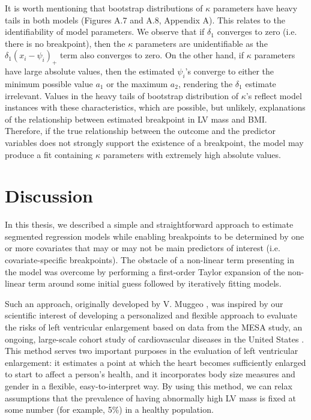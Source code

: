 \documentclass [12pt, proquest] {uwthesis}[2016/11/22]
\begin{document}
It is worth mentioning that bootstrap distributions of $\kappa$ parameters have heavy tails in both models (Figures A.7 and A.8, Appendix A). This relates to the identifiability of model parameters. We observe that if $\delta_1$ converges to zero (i.e. there is no breakpoint), then the $\kappa$ parameters are unidentifiable as the $\delta_1 (x_i - \psi_i)_+$ term also converges to zero. On the other hand, if $\kappa$ parameters have large absolute values, then the estimated $\psi_i$'s converge to either the minimum possible value $a_1$ or the maximum $a_2$, rendering the $\delta_1$ estimate irrelevant. Values in the heavy tails of bootstrap distribution of $\kappa$'s reflect model instances with these characteristics, which are possible, but unlikely, explanations of the relationship between estimated breakpoint in LV mass and BMI. Therefore, if the true relationship between the outcome and the predictor variables does not strongly support the existence of a breakpoint, the model may produce a fit containing $\kappa$ parameters with extremely high absolute values.


\chapter{Discussion}

In this thesis, we described a simple and straightforward approach to estimate segmented regression models while enabling breakpoints to be determined by one or more covariates that may or may not be main predictors of interest (i.e. covariate-specific breakpoints). The obstacle of a non-linear term presenting in the model was overcome by performing a first-order Taylor expansion of the non-linear term around some initial guess followed by iteratively fitting models. 

Such an approach, originally developed by V. Muggeo \cite{VM2003, VM2014}, was inspired by our scientific interest of developing a personalized and flexible approach to evaluate the risks of left ventricular enlargement based on data from the MESA study, an ongoing, large-scale cohort study of cardiovascular diseases in the United States \cite{MESA}. This method serves two important purposes in the evaluation of left ventricular enlargement: it estimates a point at which the heart becomes sufficiently enlarged to start to affect a person's health, and it incorporates body size measures and gender in a flexible, easy-to-interpret way. By using this method, we can relax assumptions that the prevalence of having abnormally high LV mass is fixed at some number (for example, 5\%) in a healthy population.
\end{document}
